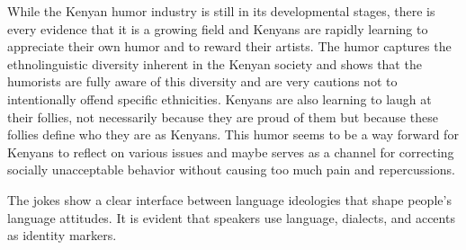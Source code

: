 \documentclass[output=paper]{langsci/langscibook}
\begin{document}
While the Kenyan humor industry is still in its developmental stages, there is every evidence that it is a growing field and Kenyans are rapidly learning to appreciate their own humor and to reward their artists. The humor captures the ethnolinguistic diversity inherent in the Kenyan society and shows that the humorists are fully aware of this diversity and are very cautions not to intentionally offend specific ethnicities. Kenyans are also learning to laugh at their follies, not necessarily because they are proud of them but because these follies define who they are as Kenyans. This humor seems to be a way forward for Kenyans to reflect on various issues and maybe serves as a channel for correcting socially unacceptable behavior without causing too much pain and repercussions.

The jokes show a clear interface between language ideologies that shape people’s language attitudes. It is evident that speakers use language, dialects, and accents as identity markers. \\


\printbibliography[heading=subbibliography,notkeyword=this]
\end{document}
